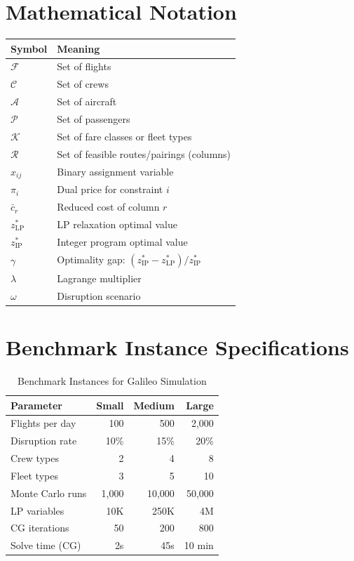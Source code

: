 \documentclass[11pt,a4paper]{book}
\theoremstyle{definition}
\begin{document}
\appendix

\chapter{Mathematical Notation}

\begin{table}[h]
\centering
\begin{tabular}{ll}
\toprule
\textbf{Symbol} & \textbf{Meaning} \\
\midrule
$\mathcal{F}$ & Set of flights \\
$\mathcal{C}$ & Set of crews \\
$\mathcal{A}$ & Set of aircraft \\
$\mathcal{P}$ & Set of passengers \\
$\mathcal{K}$ & Set of fare classes or fleet types \\
$\mathcal{R}$ & Set of feasible routes/pairings (columns) \\
$x_{ij}$ & Binary assignment variable \\
$\pi_i$ & Dual price for constraint $i$ \\
$\bar{c}_r$ & Reduced cost of column $r$ \\
$z^*_{\text{LP}}$ & LP relaxation optimal value \\
$z^*_{\text{IP}}$ & Integer program optimal value \\
$\gamma$ & Optimality gap: $(z^*_{\text{IP}} - z^*_{\text{LP}})/z^*_{\text{IP}}$ \\
$\lambda$ & Lagrange multiplier \\
$\omega$ & Disruption scenario \\
\bottomrule
\end{tabular}
\end{table}


\chapter{Benchmark Instance Specifications}

\begin{table}[h]
\centering
\caption{Benchmark Instances for Galileo Simulation}
\begin{tabular}{lrrr}
\toprule
\textbf{Parameter} & \textbf{Small} & \textbf{Medium} & \textbf{Large} \\
\midrule
Flights per day & 100 & 500 & 2,000 \\
Disruption rate & 10\% & 15\% & 20\% \\
Crew types & 2 & 4 & 8 \\
Fleet types & 3 & 5 & 10 \\
Monte Carlo runs & 1,000 & 10,000 & 50,000 \\
LP variables & 10K & 250K & 4M \\
CG iterations & 50 & 200 & 800 \\
Solve time (CG) & 2s & 45s & 10 min \\
\bottomrule
\end{tabular}
\end{table}
\end{document}
